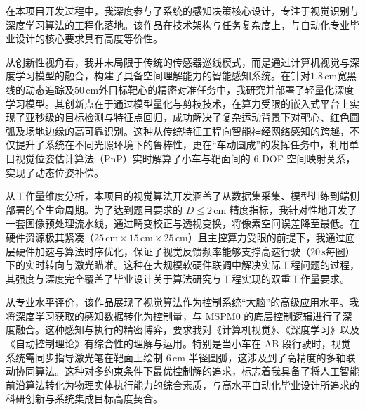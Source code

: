 \documentclass[12pt, a4paper, UTF8]{ctexart}
\begin{document}
\pagestyle{empty} %

在本项目开发过程中，我深度参与了系统的感知决策核心设计，专注于视觉识别与深度学习算法的工程化落地。该作品在技术架构与任务复杂度上，与自动化专业毕业设计的核心要求具有高度等价性。

从创新性视角看，我并未局限于传统的传感器巡线模式，而是通过计算机视觉与深度学习模型的融合，构建了具备空间理解能力的智能感知系统。在针对$1.8\,\text{cm}$宽黑线的动态追踪及$50\,\text{cm}$外目标靶心的精密对准任务中，我研究并部署了轻量化深度学习模型。其创新点在于通过模型量化与剪枝技术，在算力受限的嵌入式平台上实现了亚秒级的目标检测与特征点回归，成功解决了复杂运动背景下对靶心、红色圆弧及场地边缘的高可靠识别。这种从传统特征工程向智能神经网络感知的跨越，不仅提升了系统在不同光照环境下的鲁棒性，更在“车动圆成”的发挥任务中，利用单目视觉位姿估计算法（PnP）实时解算了小车与靶面间的 6-DOF 空间映射关系，实现了动态位姿补偿。



从工作量维度分析，本项目的视觉算法开发涵盖了从数据集采集、模型训练到端侧部署的全生命周期。为了达到题目要求的 $D \le 2\,\text{cm}$ 精度指标，我针对性地开发了一套图像预处理流水线，通过畸变校正与透视变换，将像素空间误差降至最低。在硬件资源极其紧凑（$25\,\text{cm} \times 15\,\text{cm} \times 25\,\text{cm}$）且主控算力受限的前提下，我通过底层硬件加速与算法时序优化，保证了视觉反馈频率能够支撑高速行驶（$20\,\text{s}$每圈）下的实时转向与激光瞄准。这种在大规模软硬件联调中解决实际工程问题的过程，其强度与深度完全覆盖了毕业设计关于算法研究与工程实现的双重工作量要求。

从专业水平评价，该作品展现了视觉算法作为控制系统“大脑”的高级应用水平。我将深度学习获取的感知数据转化为控制量，与 MSPM0 的底层控制逻辑进行了深度融合。这种感知与执行的精密博弈，要求我对《计算机视觉》、《深度学习》以及《自动控制理论》有综合性的理解与运用。特别是当小车在 AB 段行驶时，视觉系统需同步指导激光笔在靶面上绘制 $6\,\text{cm}$ 半径圆弧，这涉及到了高精度的多轴联动协同算法。这种对多约束条件下最优控制解的追求，标志着我具备了将人工智能前沿算法转化为物理实体执行能力的综合素质，与高水平自动化毕业设计所追求的科研创新与系统集成目标高度契合。
\end{document}
